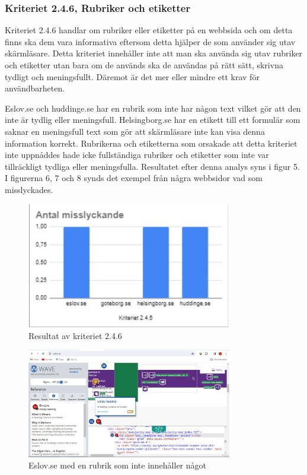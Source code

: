 \documentclass[11p]{article}
\begin{document}
    \subsubsection{Kriteriet 2.4.6, Rubriker och etiketter}
    Kriteriet 2.4.6 handlar om rubriker eller etiketter på en webbsida och om detta finns ska dem vara informativa eftersom detta hjälper de som använder sig utav skärmläsare.
    Detta kriteriet innehåller inte att man ska använda sig utav rubriker och etiketter utan bara om de används ska de användas på rätt sätt, skrivna tydligt och meningsfullt.
    Däremot är det mer eller mindre ett krav för användbarheten.

    Eslov.se och huddinge.se har en rubrik som inte har någon text vilket gör att den inte är tydlig eller meningsfull.
    Helsingborg.se har en etikett till ett formulär som saknar en meningsfull text som gör att skärmläsare inte kan visa denna information korrekt.
    Rubrikerna och etiketterna som orsakade att detta kriteriet inte uppnåddes hade icke fullständiga rubriker och etiketter som inte var tillräckligt tydliga eller meningsfulla.
    Resultatet efter denna analys syns i figur 5.
    I figurerna 6, 7 och 8 synds det exempel från några webbsidor vad som misslyckades.

    \begin{figure}[hbt!]
        \includegraphics[width=0.8\textwidth]{../images/resultat246.jpg}
        \caption{ Resultat av kriteriet 2.4.6 }
    \end{figure}

    \begin{figure}[hbt!]
        \includegraphics[width=0.8\textwidth]{../images/Eslov246.jpg}
        \caption{ Eslov.se med en rubrik som inte innehåller något }
    \end{figure}
\end{document}
